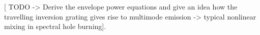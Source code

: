 \documentclass[journal]{IEEEtran}
\def\dw{\delta\omega}
\begin{document}
 


[ TODO -> Derive the envelope power equations and give an idea how the travelling inversion grating gives rise to multimode emission -> typical nonlinear mixing in spectral hole burning]. 


\end{document}
